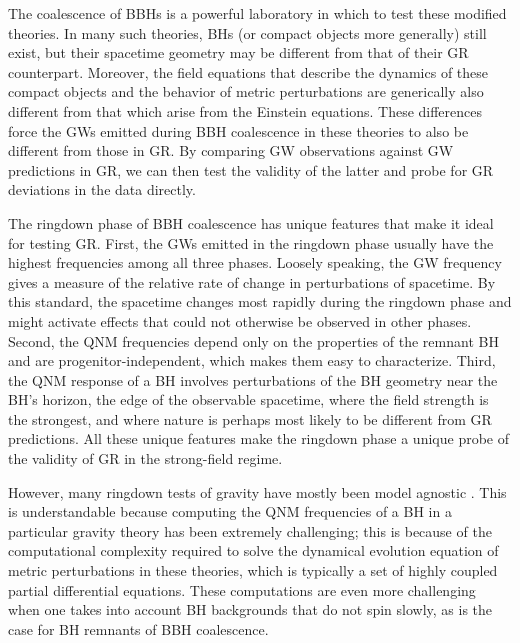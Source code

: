 \documentclass[aps,prx,amsmath,floats,floatfix,twocolumn,
  superscriptaddress,nofootinbib,showpacs]{revtex4-1}
\begin{document}
The coalescence of BBHs is a powerful laboratory in which to test these modified theories. 
In many such theories, BHs (or compact objects more generally) still exist, but their spacetime geometry may be different from that of their GR counterpart. 
Moreover, the field equations that describe the dynamics of these compact objects and the behavior of metric perturbations are generically also different from that which arise from the Einstein equations. 
These differences force the GWs emitted during BBH coalescence in these theories to also be different from those in GR. 
By comparing GW observations against GW predictions in GR, we can then test the validity of the latter and probe for GR deviations in the data directly. 

The ringdown phase of BBH coalescence has unique features that make it ideal for testing GR. 
First, the GWs emitted in the ringdown phase usually have the highest frequencies among all three phases. 
Loosely speaking, the GW frequency gives a measure of the relative rate of change in perturbations of spacetime. 
By this standard, the spacetime changes most rapidly during the ringdown phase and might activate effects that could not otherwise be  observed in other phases. 
Second, the QNM frequencies depend only on the properties of the remnant BH and are progenitor-independent, which makes them easy to characterize. 
Third, the QNM response of a BH involves perturbations of the BH geometry near the BH's horizon, the edge of the observable spacetime, where the field strength is the strongest, and where nature is perhaps most likely to be different from GR predictions. 
All these unique features make the ringdown phase a unique probe of the validity of GR in the strong-field regime. 

However, many ringdown tests of gravity have mostly been model agnostic \cite{NHT_Test_01, NHT_Test_02, NHT_Test_03, NHT_Test_04, Isi:2019aib, LIGOScientific:2016src, LIGOScientific:2020tif, LIGOScientific:2021sio}. 
This is understandable because computing the QNM frequencies of a BH in a particular gravity theory has been extremely challenging; this is because of the computational complexity required to solve the dynamical evolution equation of metric perturbations in these theories, which is typically a set of highly coupled partial differential equations. 
These computations are even more challenging when one takes into account BH backgrounds that do not spin slowly, as is the case for BH remnants of BBH coalescence. 
\end{document}
